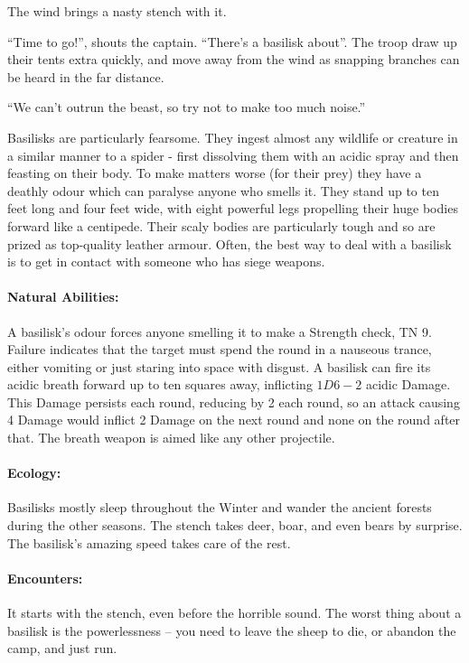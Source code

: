 \begin{multicols}{2}
\label{basilisk}
\basilisk

\begin{boxtext}

	The wind brings a nasty stench with it.

	``Time to go!'', shouts the captain.
	``There's a basilisk about''.
	The troop draw up their tents extra quickly, and move away from the wind as snapping branches can be heard in the far distance.

	``We can't outrun the beast, so try not to make too much noise.''

\end{boxtext}

Basilisks are particularly fearsome.
They ingest almost any wildlife or creature in a similar manner to a spider - first dissolving them with an acidic spray and then feasting on their body.
To make matters worse (for their prey) they have a deathly odour which can paralyse anyone who smells it.
They stand up to ten feet long and four feet wide, with eight powerful legs propelling their huge bodies forward like a centipede.
Their scaly bodies are particularly tough and so are prized as top-quality leather armour.
Often, the best way to deal with a basilisk is to get in contact with someone who has siege weapons.

\paragraph{Natural Abilities:} A basilisk's odour forces anyone smelling it to make a Strength check, TN 9.
Failure indicates that the target must spend the round in a nauseous trance, either vomiting or just staring into space with disgust.
A basilisk can fire its acidic breath forward up to ten squares away, inflicting $1D6-2$ acidic Damage.
This Damage persists each round, reducing by 2  each round, so an attack causing 4 Damage would inflict 2  Damage on the next round and none on the round after that.
The breath weapon is aimed like any other projectile.

\paragraph{Ecology:} Basilisks mostly sleep throughout the Winter and wander the ancient forests during the other seasons.
The stench takes deer, boar, and even bears by surprise.
The basilisk's amazing speed takes care of the rest.

\paragraph{Encounters:} It starts with the stench, even before the horrible sound.
The worst thing about a basilisk is the powerlessness -- you need to leave the sheep to die, or abandon the camp, and just run.


\end{multicols}
